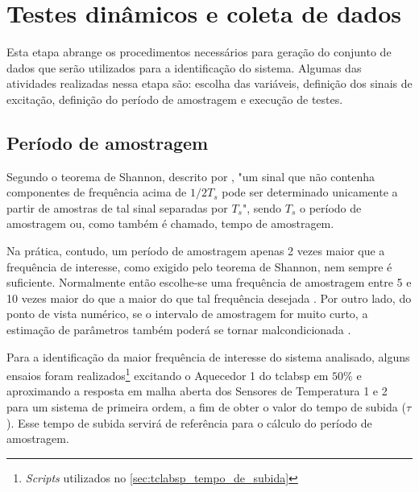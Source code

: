 \section{Testes dinâmicos e coleta de dados}
\label{sec:testes_dinamicos_e_coleta_de_dados}

Esta etapa abrange os procedimentos necessários para geração do conjunto de dados que serão utilizados
para a identificação do sistema. Algumas das atividades realizadas nessa etapa são: escolha das variáveis,
definição dos sinais de excitação, definição do período de amostragem e execução de testes.
\cite{Aguirre2015}

\subsection{Período de amostragem}
\label{subsec:periodo_de_amostragem}

Segundo o teorema de Shannon, descrito por , "um sinal que não contenha componentes
de frequência acima de $1/2T_s$ pode ser determinado unicamente a partir de amostras de tal sinal separadas
por $T_s$", sendo $T_s$ o período de amostragem ou, como também é chamado, tempo de amostragem.

Na prática, contudo, um período de amostragem apenas 2 vezes maior que a frequência de interesse, como exigido
pelo teorema de Shannon, nem sempre é suficiente. Normalmente então escolhe-se uma frequência de amostragem
entre 5 e 10 vezes maior do que a maior do que tal frequência desejada \cite{Aguirre2015}. Por outro lado, do
ponto de vista numérico, se o intervalo de amostragem for muito curto, a estimação de parâmetros também
poderá se tornar malcondicionada \cite{Aguirre2015}.

Para a identificação da maior frequência de interesse do sistema analisado, alguns ensaios foram realizados\footnote{
    \textit{Scripts} utilizados no \cref{sec:tclabsp_tempo_de_subida}
}
excitando o Aquecedor 1 do \acrshort{tclabsp} em $50\%$ e aproximando a resposta em malha aberta dos
Sensores de Temperatura 1 e 2 para um sistema de primeira ordem, a fim de obter o valor do tempo de subida
($\tau$). Esse tempo de subida servirá de referência para o cálculo do período de amostragem.

